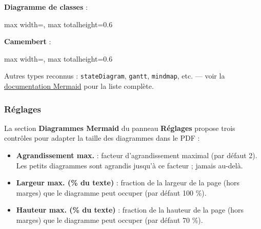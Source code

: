\documentclass[11pt,a4paper]{article}
\theoremstyle{definition}
\begin{document}
\textbf{Diagramme de classes} :


\begin{center}
\begin{adjustbox}{max width=\textwidth, max totalheight=0.6\textheight}

\end{adjustbox}
\end{center}


\textbf{Camembert} :


\begin{center}
\begin{adjustbox}{max width=\textwidth, max totalheight=0.6\textheight}

\end{adjustbox}
\end{center}


Autres types reconnus : \texttt{stateDiagram}, \texttt{gantt}, \texttt{mindmap}, etc. — voir
la \href{https://mermaid.js.org/}{documentation Mermaid} pour la liste
complète.


\subsubsection{Réglages}

La section \textbf{Diagrammes Mermaid} du panneau \textbf{Réglages} propose
trois contrôles pour adapter la taille des diagrammes dans le PDF :


\begin{itemize}
  \item \textbf{Agrandissement max.} : facteur d'agrandissement maximal
(par défaut 2). Les petits diagrammes sont agrandis jusqu'à ce
facteur ; jamais au-delà.
  \item \textbf{Largeur max. (\% du texte)} : fraction de la largeur de la page
(hors marges) que le diagramme peut occuper (par défaut 100 \%).
  \item \textbf{Hauteur max. (\% du texte)} : fraction de la hauteur de la page
(hors marges) que le diagramme peut occuper (par défaut 70 \%).
\end{itemize}



\noindent\hrulefill\par
\end{document}
